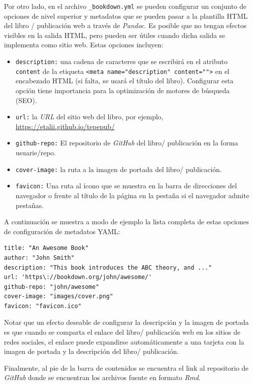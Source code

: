 \documentclass[
]{krantz}
\begin{document}
Por otro lado, en el archivo \texttt{\_bookdown.yml} se pueden configurar un conjunto de opciones de nivel superior y metadatos que se pueden pasar a la plantilla HTML del libro / publicación web a través de \emph{Pandoc}. Es posible que no tengan efectos visibles en la salida HTML, pero pueden ser útiles cuando dicha salida se implementa como sitio web. Estas opciones incluyen:

\begin{itemize}
\item
  \texttt{description:} una cadena de caracteres que se escribirá en el atributo \texttt{content} de la etiqueta \texttt{\textless{}meta\ name="description"\ content=""\textgreater{}} en el encabezado HTML (si falta, se usará el título del libro). Configurar esta opción tiene importancia para la optimización de motores de búsqueda (SEO).
\item
  \texttt{url:} la \emph{URL} del sitio web del libro, por ejemplo, \url{https://etalii.github.io/tepepub/}
\item
  \texttt{github-repo:} El repositorio de \emph{GitHub} del libro/ publicación en la forma usuarie/repo.
\item
  \texttt{cover-image:} la ruta a la imagen de portada del libro/ publicación.
\item
  \texttt{favicon:} Una ruta al ícono que se muestra en la barra de direcciones del navegador o frente al título de la página en la pestaña si el navegador admite pestañas.
\end{itemize}

A continuación se muestra a modo de ejemplo la lista completa de estas opciones de configuración de metadatos YAML:

\begin{verbatim}
title: "An Awesome Book"
author: "John Smith"
description: "This book introduces the ABC theory, and ..."
url: 'https\://bookdown.org/john/awesome/'
github-repo: "john/awesome"
cover-image: "images/cover.png"
favicon: "favicon.ico"
\end{verbatim}

Notar que un efecto deseable de configurar la descripción y la imagen de portada es que cuando se comparta el enlace del libro/ publicación web en los sitios de redes sociales, el enlace puede expandirse automáticamente a una tarjeta con la imagen de portada y la descripción del libro/ publicación.

Finalmente, al pie de la barra de contenidos se encuentra el link al repositorio de \emph{GitHub} donde se encuentran los archivos fuente en formato \emph{Rmd}.
\end{document}

